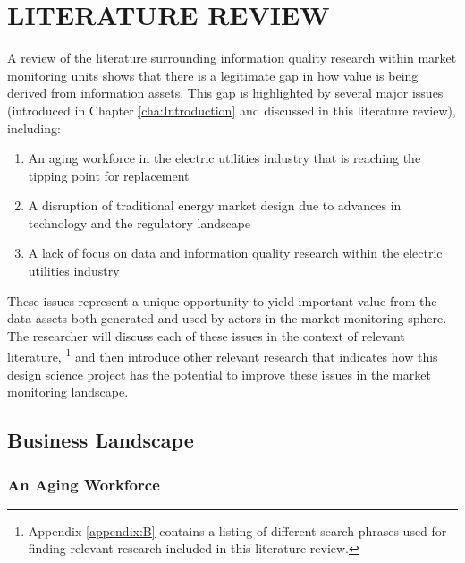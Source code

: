 %
%
%
%  
%



\chapter{\MakeUppercase{Literature Review}}
\label{cha:literature-review}

A review of the literature surrounding information quality research within market monitoring units shows that there is a legitimate gap in how value is being derived from information assets. This gap is highlighted by several major issues (introduced in Chapter \ref{cha:Introduction} and discussed in this literature review), including: 

\begin{enumerate}
    \item{An aging workforce in the electric utilities industry that is reaching the tipping point for replacement}
    \item{A disruption of traditional energy market design due to advances in technology and the regulatory landscape}
    \item{A lack of focus on data and information quality research within the electric utilities industry}
\end{enumerate}

\noindent These issues represent a unique opportunity to yield important value from the data assets both generated and used by actors in the market monitoring sphere. The researcher will discuss each of these issues in the context of relevant literature,
\footnote{Appendix \ref{appendix:B} contains a listing of different search phrases used for finding relevant research included in this literature review.}
and then introduce other relevant research that indicates how this design science project has the potential to improve these issues in the market monitoring landscape.

\section{Business Landscape}
\subsection{An Aging Workforce}

